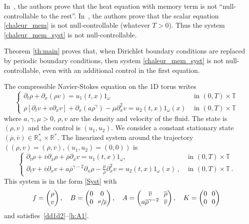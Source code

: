 \documentclass[10pt]{amsart}
\theoremstyle{plain}
\theoremstyle{definition}
\theoremstyle{remark}
\newcommand{\set}{\mathbb}
\newcommand{\R}{} %
\renewcommand{\R}{\set{R}}
\newcommand{\T}{\set{T}}
\begin{document}
In~\cite{ivanov_2009}, the authors prove that the heat equation with memory term is not ``null-controllable to the rest''.
In~\cite{guerrero_2013}, the authors prove that the scalar equation \eqref{chaleur_mem} is not null-controllable (whatever $T>0$).
Thus the system \eqref{chaleur_mem_syst} is not null-controllable.

Theorem \ref{th:main} proves that, when Dirichlet boundary conditions are replaced by periodic boundary conditions, then system \eqref{chaleur_mem_syst} is not null-controllable, even with an additional control in the first equation.


The compressible Navier-Stokes equation on the 1D torus writes
\[
\begin{cases}
\partial_t \rho + \partial_x (\rho v) = u_1(t,x) 1_\omega \quad & \text{ in } (0,T)\times\T \\
\rho[\partial_t v + v \partial_x v ] + \partial_x(a \rho^\gamma)- \mu \partial_x^2v = u_2(t,x)1_\omega(x) & \text{ in } (0,T)\times\T
\end{cases}
\]
where $a,\gamma, \mu>0$, $\rho, v$ are the density and velocity of the fluid. The state is $(\rho,v)$ and the control is $(u_1,u_2)$. We consider a constant stationary state $(\overline{\rho},\overline{v}) \in \R^*_+ \times \R^*$. The linearized system around the trajectory $((\rho,v)=(\overline{\rho},\overline{v}),(u_1,u_2)=(0,0))$ is
\begin{equation} \label{NSCL}
\begin{cases}
\partial_t \rho + \overline{v} \partial_x \rho + \overline{\rho}\partial_x v = u_1(t,x) 1_\omega, \ & \text{ in } (0,T)\times\T
\\
\partial_t v + \overline{v} \partial_x v + a \overline{\rho}^{\gamma-2} \partial_x \rho - \frac{\mu}{\overline{\rho}} \partial_x^2 v = u_2(t,x)1_\omega(x)\,, & \text{ in } (0,T)\times\T\,.
\end{cases}
\end{equation}
This system is in the form \eqref{Syst} with
\[\arraycolsep3.5pt
f=\begin{pmatrix}
\rho \\ v
\end{pmatrix}, \quad
B=\begin{pmatrix}
0 & 0 \\ 0 & \sfrac{\mu}{\overline{\rho}}
\end{pmatrix}, \quad
A=\begin{pmatrix}
\overline{v} & \overline{\rho} \\ a \overline{\rho}^{\gamma-2} & \overline{v}
\end{pmatrix}, \quad
K=\begin{pmatrix}
0 & 0 \\ 0 & 0
\end{pmatrix}
\]
and satisfies~\eqref{dd1d2}--\eqref{h:A1}.
\end{document}
